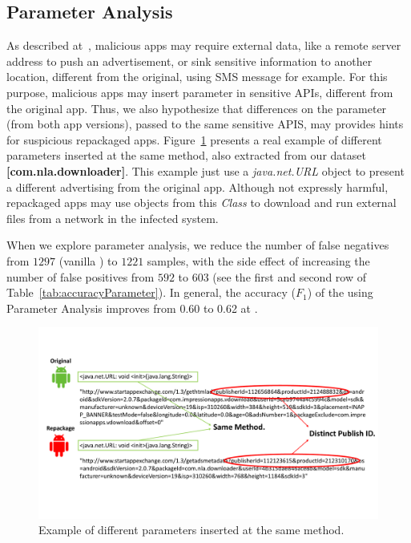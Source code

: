 \subsection{Parameter Analysis}

As described at~\cite{le2018towards}, malicious apps may require external data, like a remote server address to push an advertisement, or sink sensitive information to another location, different from the original, using SMS message for example. For this purpose, malicious apps may insert parameter in sensitive APIs, different from the original app. Thus, we also hypothesize that differences on the parameter (from both app versions), passed to the same sensitive APIS, may provides hints for suspicious repackaged apps. Figure~\ref{fig:parameterDiff} presents a real example of different parameters inserted at the same method, also extracted from our dataset \textbf{[com.nla.downloader]}. This example just use a \textit{java.net.URL} object to present a different advertising from the original app. Although not expressly harmful, repackaged apps may use objects from this \textit{Class} to download and run external files from a network in the infected system\cite{DBLP:journals/compsec/ObaidatSPP22}.

When we explore parameter analysis, we reduce the number of false negatives from $1297$ (vanilla \mas) to $1221$ samples, with the side effect of increasing the number of false positives from $592$ to $603$ (see the first and second row of Table~\ref{tab:accuracyParameter}).
In general, the accuracy ($F_1$) of the \mas using Parameter Analysis improves from 0.60 to 0.62 at \cds.



\begin{figure}[t]
\centering
\includegraphics[scale=0.3]{images/parameterDiff.pdf}
\caption{Example of different parameters inserted at the same method.}
 \label{fig:parameterDiff}
\end{figure}


